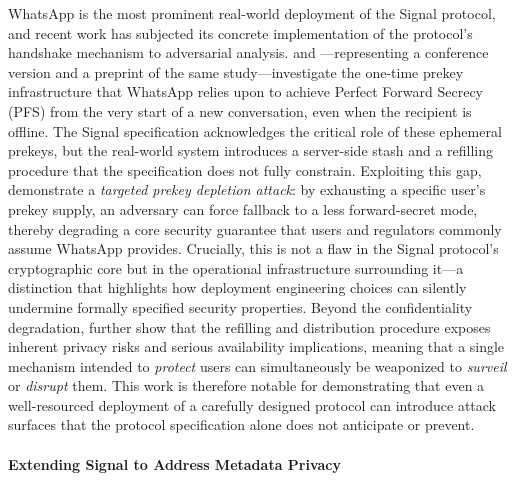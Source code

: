 WhatsApp is the most prominent real-world deployment of the Signal protocol, and recent work has subjected its concrete implementation of the protocol's handshake mechanism to adversarial analysis. \textcite{gegenhuber2025} and \textcite{gegenhuber2025b}—representing a conference version and a preprint of the same study—investigate the one-time prekey infrastructure that WhatsApp relies upon to achieve Perfect Forward Secrecy (PFS) from the very start of a new conversation, even when the recipient is offline. The Signal specification acknowledges the critical role of these ephemeral prekeys, but the real-world system introduces a server-side stash and a refilling procedure that the specification does not fully constrain. Exploiting this gap, \textcite{gegenhuber2025} demonstrate a \emph{targeted prekey depletion attack}: by exhausting a specific user's prekey supply, an adversary can force fallback to a less forward-secret mode, thereby degrading a core security guarantee that users and regulators commonly assume WhatsApp provides. Crucially, this is not a flaw in the Signal protocol's cryptographic core but in the operational infrastructure surrounding it—a distinction that highlights how deployment engineering choices can silently undermine formally specified security properties. Beyond the confidentiality degradation, \textcite{gegenhuber2025b} further show that the refilling and distribution procedure exposes inherent privacy risks and serious availability implications, meaning that a single mechanism intended to \emph{protect} users can simultaneously be weaponized to \emph{surveil} or \emph{disrupt} them. This work is therefore notable for demonstrating that even a well-resourced deployment of a carefully designed protocol can introduce attack surfaces that the protocol specification alone does not anticipate or prevent.

\paragraph{Extending Signal to Address Metadata Privacy}

